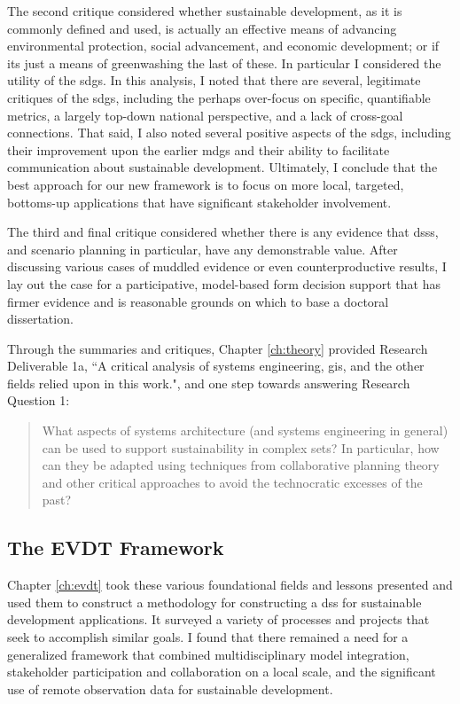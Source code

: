 The second critique considered whether sustainable development, as it is commonly defined and used, is actually an effective means of advancing environmental protection, social advancement, and economic development; or if its just a means of greenwashing the last of these. In particular I considered the utility of the \acfp{sdg}. In this analysis, I noted that there are several, legitimate critiques of the \acp{sdg}, including the perhaps over-focus on specific, quantifiable metrics, a largely top-down national perspective, and a lack of cross-goal connections. That said, I also noted several positive aspects of the \acp{sdg}, including their improvement upon the earlier \acfp{mdg} and their ability to facilitate communication about sustainable development. Ultimately, I conclude that the best approach for our new framework is to focus on more local, targeted, bottoms-up applications that have significant stakeholder involvement.

The third and final critique considered whether there is any evidence that \acp{dss}, and scenario planning in particular, have any demonstrable value. After discussing various cases of muddled evidence or even counterproductive results, I lay out the case for a participative, model-based form decision support that has firmer evidence and is reasonable grounds on which to base a doctoral dissertation.

Through the summaries and critiques, Chapter \ref{ch:theory} provided Research Deliverable 1a, ``A critical analysis of systems engineering, \ac{gis}, and the other fields relied upon in this work.", and one step towards answering Research Question 1:

\blockquote{What aspects of systems architecture (and systems engineering in general) can be used to support sustainability in complex \ac{sets}? In particular, how can they be adapted using techniques from collaborative planning theory and other critical approaches to avoid the technocratic excesses of the past?}

\subsection{The EVDT Framework}

Chapter \ref{ch:evdt} took these various foundational fields and lessons presented and used them to construct a methodology for constructing a \ac{dss} for sustainable development applications. It surveyed a variety of processes and projects that seek to accomplish similar goals. I found that there remained a need for a generalized framework that combined multidisciplinary model integration, stakeholder participation and collaboration on a local scale, and the significant use of remote observation data for sustainable development.

